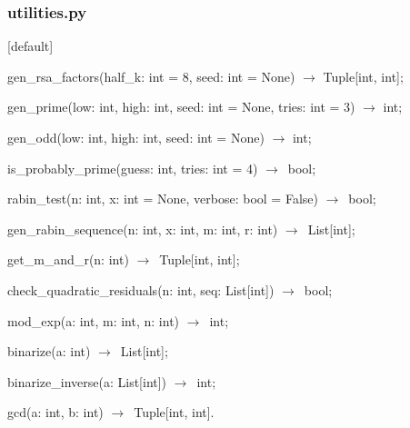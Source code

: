 \documentclass{beamer}
\begin{document}
\begin{frame}
\frametitle{utilities.py}
[default]

{\small
  \begin{enumerate}
    \item gen\_rsa\_factors(half\_k: int = 8, seed: int = None) $\rightarrow$ Tuple[int, int];
    {
      \item gen\_prime(low: int, high: int, seed: int = None, tries: int = 3) $\rightarrow$ int;
    }
    {
      \item gen\_odd(low: int, high: int, seed: int = None) $\rightarrow$ int;
    }
    {
      \item is\_probably\_prime(guess: int, tries: int = 4) $\rightarrow$\ bool;
    }
    {
    \item rabin\_test(n: int, x: int = None, verbose: bool = False) $\rightarrow$\ bool;
    }
    {
    \item gen\_rabin\_sequence(n: int, x: int, m: int, r: int) $\rightarrow$\ List[int];
    }
    {
    \item get\_m\_and\_r(n: int) $\rightarrow$\ Tuple[int, int];
    }
    {
    \item check\_quadratic\_residuals(n: int, seq: List[int]) $\rightarrow$\ bool;
    }
    {
    \item mod\_exp(a: int, m: int, n: int) $\rightarrow$\ int;
    }
    {
    \item binarize(a: int) $\rightarrow$\ List[int];
    }
    {
    \item binarize\_inverse(a: List[int]) $\rightarrow$\ int;
    }
    {
      \item gcd(a: int, b: int) $\rightarrow$\ Tuple[int, int].
    }
  \end{enumerate}
}

\end{frame}
\end{document}
